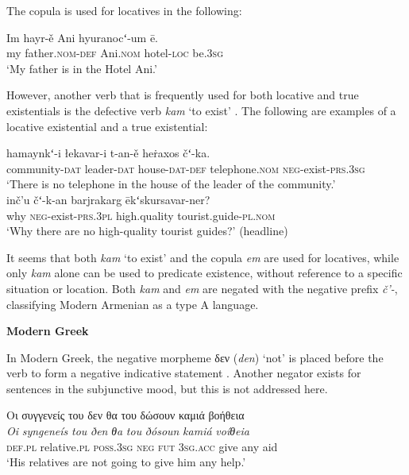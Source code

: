﻿\documentclass[output=paper]{langsci/langscibook}
\begin{document}
\begin{unindented}
The copula is used for locatives in the following:
%
\begin{exe}\ex \gll Im hayr-ě Ani hyuranocʻ-um ē.  \\
my father.\textsc{nom}-\textsc{def} Ani.\textsc{nom} hotel-\textsc{loc} be.\textsc{3sg} \\
    \glt `My father is in the Hotel Ani.' \parencite[382]{DumTragut2009}
    \end{exe}

However, another verb that is frequently used for both locative and true
existentials is the defective verb \textit{kam} `to exist' \parencite[282]{DumTragut2009}. The following are examples of a locative existential and a true existential:
%
\begin{exe}\ex \gll hamaynkʻ-i łekavar-i t-an-ě heṙaxos čʻ-ka.  \\
community-\textsc{dat} leader-\textsc{dat} house-\textsc{dat-def} 
telephone.\textsc{nom} \textsc{neg}-exist-\textsc{prs.3sg} \\
    \glt `There is no telephone in the house of the leader of the
community.' \\
\parencite[104--105]{DumTragut2009}
\ex \gll inč’u čʻ-k-an barjrakarg ēkʻskursavar-ner?  \\
why \textsc{neg}-exist-\textsc{prs.3pl} high.quality tourist.guide-\textsc{pl.nom} \\
    \glt `Why there are no high-quality tourist guides?' (headline)
\parencite[693]{DumTragut2009}
    \end{exe}

It seems that both \textit{kam} `to exist' and the copula \textit{em} are used for locatives, while only \textit{kam} alone can be used to predicate existence, without reference to a specific situation or location. Both \textit{kam} and \textit{em} are negated with the negative prefix \textit{č’-}, classifying Modern Armenian as a type A language. 

\textbf{Modern Greek}

In Modern Greek, the negative morpheme δεν
(\textit{den}) `not' is placed before the verb to form a negative
indicative statement \parencite[510]{HoltonMackridge2012}. Another negator exists for sentences in the subjunctive mood, but this is not addressed here. 
%
\begin{exe}\ex \glll
Οι συγγενείς του δεν θα του δώσουν καμιά βοήθεια \\
\textit{Oi} \textit{syngeneís} \textit{tou} \textit{ðen} \textit{θa} \textit{tou} \textit{ðósoun} \textit{kamiá} \textit{voíθeia}\\
\textsc{def.pl}  relative.\textsc{pl} \textsc{poss.3sg} \textsc{neg}  \textsc{fut} \textsc{3sg.acc} give any aid \\
    \glt `His relatives are not going to give him any help.' \parencite[510]{HoltonMackridge2012}
    \end{exe}


\end{unindented}
\end{document}
